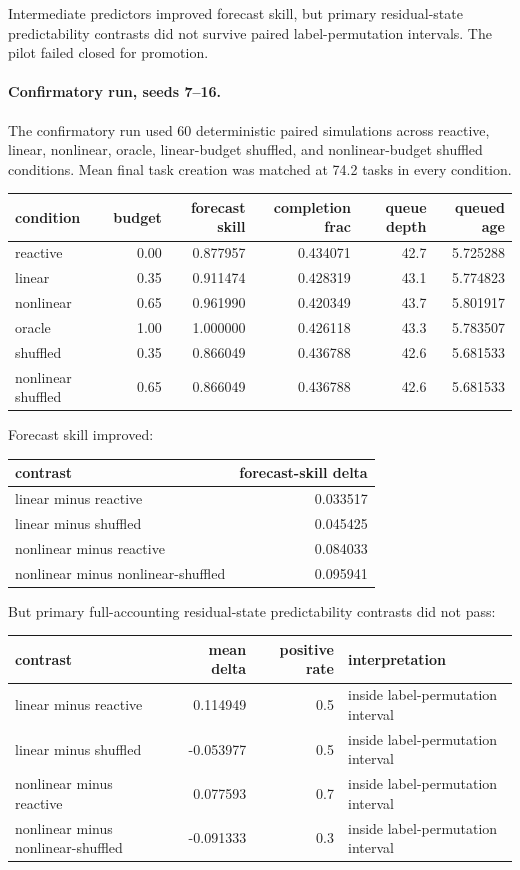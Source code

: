 \documentclass[11pt]{article}
\begin{document}
Intermediate predictors improved forecast skill, but primary residual-state
predictability contrasts did not survive paired label-permutation intervals.
The pilot failed closed for promotion.

\paragraph{Confirmatory run, seeds 7--16.}
The confirmatory run used 60 deterministic paired simulations across reactive,
linear, nonlinear, oracle, linear-budget shuffled, and nonlinear-budget
shuffled conditions. Mean final task creation was matched at 74.2 tasks in
every condition.

\begin{center}
\begin{tabular}{lrrrrr}
condition & budget & forecast skill & completion frac & queue depth & queued age \\
\hline
reactive & 0.00 & 0.877957 & 0.434071 & 42.7 & 5.725288 \\
linear & 0.35 & 0.911474 & 0.428319 & 43.1 & 5.774823 \\
nonlinear & 0.65 & 0.961990 & 0.420349 & 43.7 & 5.801917 \\
oracle & 1.00 & 1.000000 & 0.426118 & 43.3 & 5.783507 \\
shuffled & 0.35 & 0.866049 & 0.436788 & 42.6 & 5.681533 \\
nonlinear shuffled & 0.65 & 0.866049 & 0.436788 & 42.6 & 5.681533
\end{tabular}
\end{center}

Forecast skill improved:

\begin{center}
\begin{tabular}{lr}
contrast & forecast-skill delta \\
\hline
linear minus reactive & 0.033517 \\
linear minus shuffled & 0.045425 \\
nonlinear minus reactive & 0.084033 \\
nonlinear minus nonlinear-shuffled & 0.095941
\end{tabular}
\end{center}

But primary full-accounting residual-state predictability contrasts did not
pass:

\begin{center}
\begin{tabular}{lrrl}
contrast & mean delta & positive rate & interpretation \\
\hline
linear minus reactive & 0.114949 & 0.5 & inside label-permutation interval \\
linear minus shuffled & -0.053977 & 0.5 & inside label-permutation interval \\
nonlinear minus reactive & 0.077593 & 0.7 & inside label-permutation interval \\
nonlinear minus nonlinear-shuffled & -0.091333 & 0.3 & inside label-permutation interval
\end{tabular}
\end{center}
\end{document}
